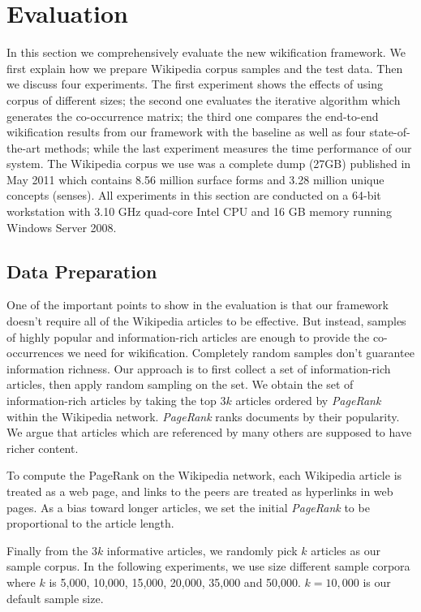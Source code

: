 \section{Evaluation}
\label{sec:eval}

In this section we comprehensively evaluate the new wikification framework.
We first explain how we prepare Wikipedia corpus samples and the test data.
Then we discuss four experiments. The first experiment shows
the effects of using corpus of different sizes; the second one evaluates
the iterative algorithm which generates the co-occurrence
matrix; the third one compares the end-to-end wikification results from
our framework with the baseline as well as four state-of-the-art methods;
while the last experiment measures the time performance of our system.
The Wikipedia corpus we use was a complete dump \cite{wikipedia} (27GB)
published in May 2011 which contains 8.56 million surface forms and
3.28 million unique concepts (senses). All experiments in this section
are conducted on a 64-bit workstation with 3.10 GHz quad-core Intel CPU
and 16 GB memory running Windows Server 2008.


\subsection{Data Preparation}
\label{sec:testdata}
One of the important points to show in the evaluation is that
our framework doesn't require all of the Wikipedia articles to be
effective. But instead, samples of highly popular and information-rich
articles are enough to provide the co-occurrences we need for wikification.
Completely random samples don't guarantee information richness.
Our approach is to first collect a set of information-rich articles,
then apply random sampling on the set.
We obtain the set of information-rich articles by taking the top $3k$ articles
ordered by \emph{PageRank}\cite{Brin1998} within the Wikipedia network.
\emph{PageRank} ranks documents by their popularity.
We argue that articles which are referenced by many others are supposed
to have richer content.

To compute the PageRank on the Wikipedia network,
each Wikipedia article is treated as a web page, and links to the peers
are treated as hyperlinks in web pages.
As a bias toward longer articles, we set the initial \emph{PageRank}
to be proportional to the article length.

Finally from the $3k$ informative articles, we randomly pick $k$ articles as
our sample corpus. In the following experiments, we use
size different sample corpora where $k$ is
5,000, 10,000, 15,000, 20,000, 35,000 and 50,000.
$k = 10,000$ is our default sample size.

